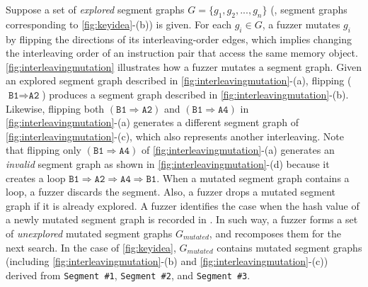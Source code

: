 %
Suppose a set of \textit{explored} segment graphs
$G = \{g_1, g_2, ..., g_n \}$ (\eg, segment graphs corresponding to
\autoref{fig:keyidea}-(b)) is given.
%
For each $g_i \in G$, a fuzzer mutates $g_i$ by flipping the
directions of its interleaving-order edges, which implies changing the
interleaving order of an instruction pair that access the same memory
object.
%
\autoref{fig:interleavingmutation} illustrates how a fuzzer mutates a
segment graph.
%
Given an explored segment graph described in
\autoref{fig:interleavingmutation}-(a), flipping
($\texttt{B1} \Rightarrow \texttt{A2}$) produces a segment graph
described in \autoref{fig:interleavingmutation}-(b).
%
%
Likewise, flipping both $(\texttt{B1} \Rightarrow \texttt{A2})$ and
$(\texttt{B1} \Rightarrow \texttt{A4})$ in
\autoref{fig:interleavingmutation}-(a) generates a different segment graph
of \autoref{fig:interleavingmutation}-(c), which also represents
another interleaving.
%
Note that flipping only
$(\texttt{B1} \Rightarrow \texttt{A4})$  of
\autoref{fig:interleavingmutation}-(a) generates an \textit{invalid}
segment graph as shown in \autoref{fig:interleavingmutation}-(d)
because it creates a loop
$\texttt{B1} \Rightarrow \texttt{A2} \Rightarrow \texttt{A4}
\Rightarrow \texttt{B1}$.
%
%
When a mutated segment graph contains a loop, a fuzzer discards the
segment.
%
Also, a fuzzer drops a mutated segment graph if it is already
explored. A fuzzer identifies the case when the hash value of a newly
mutated segment graph is recorded in \intcov.
%
In such way, a fuzzer forms a set of \textit{unexplored} mutated
segment graphs $G_{mutated}$, and recomposes them for the next search.
%
\dr{}
In the case of \autoref{fig:keyidea}, $G_{mutated}$ contains mutated
segment graphs (including \autoref{fig:interleavingmutation}-(b) and
\autoref{fig:interleavingmutation}-(c)) derived from \texttt{Segment
  \#1}, \texttt{Segment \#2}, and \texttt{Segment \#3}.

